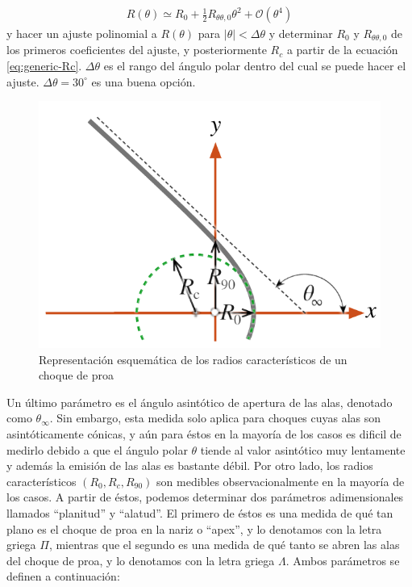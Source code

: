 \begin{align}
  R(\theta) \simeq R_0 + \frac{1}{2}R_{\theta\theta, 0}\theta^2 + \mathcal{O}(\theta^4)
\end{align}
y hacer un ajuste polinomial a $R(\theta)$ para $|\theta| < \Delta\theta$ y determinar $R_0$ y $R_{\theta\theta, 0}$ de los primeros coeficientes del ajuste, y posteriormente $R_c$ a partir de la ecuación \ref{eq:generic-Rc}. $\Delta\theta$ es el rango del ángulo polar dentro del cual se puede hacer el ajuste. $\Delta\theta = 30^\circ$ es una buena opción.

\begin{figure}
  \includegraphics[width=0.5\linewidth]{./Figures/characteristic-radii}
  \caption{Representación esquemática de los radios característicos de un choque de proa}
  \label{fig:char-radii}
\end{figure}
Un último parámetro es el ángulo asintótico de apertura de las alas, denotado como $\theta_\infty$. Sin embargo, esta medida solo aplica para choques cuyas alas son asintóticamente cónicas, y aún para éstos en la mayoría de los casos es dificil de medirlo debido a que el ángulo polar $\theta$ tiende al valor asintótico muy lentamente y además la emisión de las alas es bastante débil. Por otro lado, los radios característicos $(R_0, R_c, R_{90})$ son medibles observacionalmente en la mayoría de los casos. A partir de éstos, podemos determinar dos parámetros adimensionales llamados ``planitud'' y ``alatud''. El primero de éstos es una medida de qué tan plano es el choque de proa en la nariz o ``apex'', y lo denotamos con la letra griega $\Pi$, mientras que el segundo es una medida de qué tanto se abren las alas del choque de proa, y lo denotamos con la letra griega $\Lambda$. Ambos parámetros se definen a continuación:

